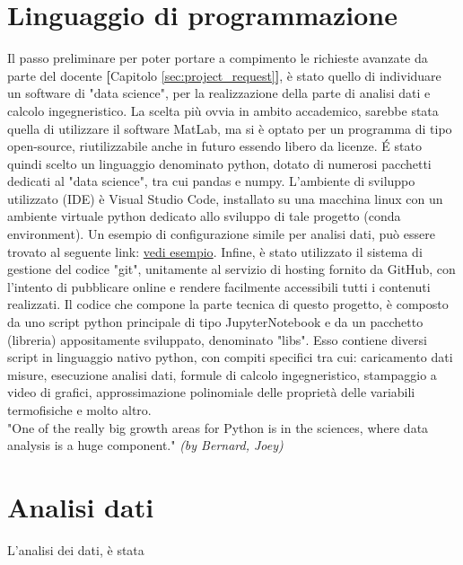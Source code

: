 \documentclass[a4paper,10pt]{article}                                                                                       %
\begin{document}
\section{Linguaggio di programmazione}                                                                                      %
\label{sec:progr_lang}                                                                                                      %
  Il passo preliminare per poter portare a compimento le richieste avanzate da parte del docente
  \textbf{[}Capitolo \ref{sec:project_request}\textbf{]}, è stato quello di individuare un software di "data science", per
  la realizzazione della parte di analisi dati e calcolo ingegneristico. La scelta più ovvia in ambito accademico, sarebbe
  stata quella di utilizzare il software MatLab, ma si è optato per un programma di tipo open-source, riutilizzabile anche
  in futuro essendo libero da licenze. É stato quindi scelto un linguaggio denominato python, dotato di numerosi pacchetti
  dedicati al "data science", tra cui pandas e numpy. L'ambiente di sviluppo utilizzato (IDE) è Visual Studio Code,
  installato su una macchina linux con un ambiente virtuale python dedicato allo sviluppo di tale progetto
  (conda environment). Un esempio di configurazione simile per analisi dati, può essere trovato al seguente link:
  \href{https://code.visualstudio.com/docs/datascience/data-science-tutorial}{vedi esempio}. Infine, è stato utilizzato il
  sistema di gestione del codice "git", unitamente al servizio di hosting fornito da GitHub, con l'intento di pubblicare
  online e rendere facilmente accessibili tutti i contenuti realizzati. Il codice che compone la parte tecnica di questo
  progetto, è composto da uno script python principale di tipo JupyterNotebook e da un pacchetto (libreria) appositamente
  sviluppato, denominato "libs". Esso contiene diversi script in linguaggio nativo python, con compiti specifici tra cui:
  caricamento dati misure, esecuzione analisi dati, formule di calcolo ingegneristico, stampaggio a video di grafici,
  approssimazione polinomiale delle proprietà delle variabili termofisiche e molto altro.\vspace{2mm}\\
  "One of the really big growth areas for Python is in the sciences, where data analysis is a huge component."
  \textit{(by Bernard, Joey)}
  \cite{Bernard2016}

\section{Analisi dati}                                                                                                      %
\label{sec:data_analysis}                                                                                                   %
  L'analisi dei dati, è stata 
\end{document}
